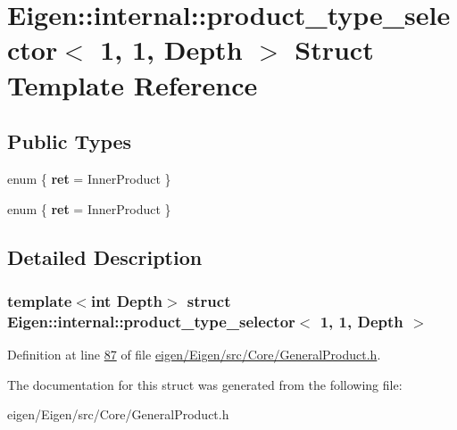 \hypertarget{struct_eigen_1_1internal_1_1product__type__selector_3_011_00_011_00_01_depth_01_4}{}\section{Eigen\+:\+:internal\+:\+:product\+\_\+type\+\_\+selector$<$ 1, 1, Depth $>$ Struct Template Reference}
\label{struct_eigen_1_1internal_1_1product__type__selector_3_011_00_011_00_01_depth_01_4}
\subsection*{Public Types}
\begin{DoxyCompactItemize}
\item 
\mbox{\label{struct_eigen_1_1internal_1_1product__type__selector_3_011_00_011_00_01_depth_01_4_a4644b03f2267939eeae3a5ebcfc46357}} 
enum \{ {\bfseries ret} = Inner\+Product
 \}
\item 
\mbox{\label{struct_eigen_1_1internal_1_1product__type__selector_3_011_00_011_00_01_depth_01_4_ab63393b0d7e1d501b389689c5b2630c0}} 
enum \{ {\bfseries ret} = Inner\+Product
 \}
\end{DoxyCompactItemize}


\subsection{Detailed Description}
\subsubsection*{template$<$int Depth$>$\newline
struct Eigen\+::internal\+::product\+\_\+type\+\_\+selector$<$ 1, 1, Depth $>$}



Definition at line \hyperlink{eigen_2_eigen_2src_2_core_2_general_product_8h_source_l00087}{87} of file \hyperlink{eigen_2_eigen_2src_2_core_2_general_product_8h_source}{eigen/\+Eigen/src/\+Core/\+General\+Product.\+h}.



The documentation for this struct was generated from the following file\+:\begin{DoxyCompactItemize}
\item 
eigen/\+Eigen/src/\+Core/\+General\+Product.\+h\end{DoxyCompactItemize}
